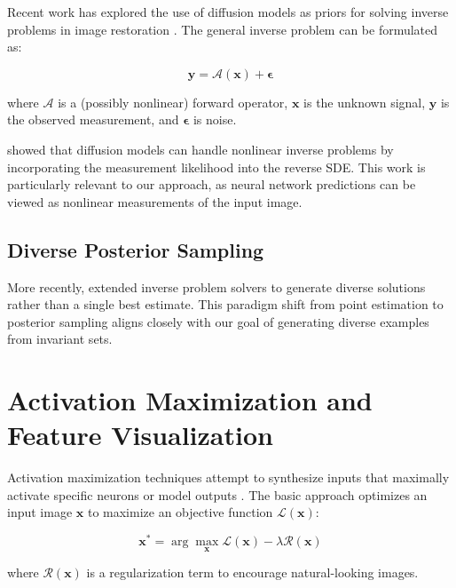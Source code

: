 \documentclass[licencjacka,en]{pracamgr}
\begin{document}
Recent work has explored the use of diffusion models as priors for solving inverse problems in image restoration \cite{song2023pseudoinverse, chung2024diffusionposteriorsamplinggeneral}. The general inverse problem can be formulated as:

\begin{equation}
\mathbf{y} = \mathcal{A}(\mathbf{x}) + \boldsymbol{\epsilon}
\label{eq:inverse_problem}
\end{equation}

where $\mathcal{A}$ is a (possibly nonlinear) forward operator, $\mathbf{x}$ is the unknown signal, $\mathbf{y}$ is the observed measurement, and $\boldsymbol{\epsilon}$ is noise.

\cite{chung2024diffusionposteriorsamplinggeneral} showed that diffusion models can handle nonlinear inverse problems by incorporating the measurement likelihood into the reverse SDE. This work is particularly relevant to our approach, as neural network predictions can be viewed as nonlinear measurements of the input image.

\subsection{Diverse Posterior Sampling}

More recently, \cite{cohen2024posteriorsamplingmeaningfuldiversity} extended inverse problem solvers to generate diverse solutions rather than a single best estimate. This paradigm shift from point estimation to posterior sampling aligns closely with our goal of generating diverse examples from invariant sets.

\section{Activation Maximization and Feature Visualization}

Activation maximization techniques attempt to synthesize inputs that maximally activate specific neurons or model outputs \cite{erhan2009visualizing, mordvintsev2015deepdream}. The basic approach optimizes an input image $\mathbf{x}$ to maximize an objective function $\mathcal{L}(\mathbf{x})$:

\begin{equation}
\mathbf{x}^* = \arg\max_{\mathbf{x}} \mathcal{L}(\mathbf{x}) - \lambda \mathcal{R}(\mathbf{x})
\label{eq:activation_maximization}
\end{equation}

where $\mathcal{R}(\mathbf{x})$ is a regularization term to encourage natural-looking images.
\end{document}
